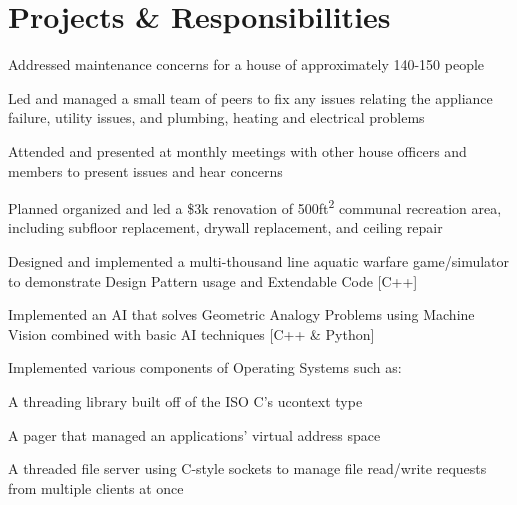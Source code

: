 \documentclass[letterpaper]{headers} %
\begin{document}
\begin{minipage}[t]{0.66\textwidth}
\sectionspace

\section{Projects \& Responsibilities}
	\begin{tightitemize}
		\item Addressed maintenance concerns for a house of approximately 140-150 people
		\item Led and managed a small team of peers to fix any issues relating the appliance failure, utility issues, and plumbing, heating and electrical problems
		\item Attended and presented at monthly meetings with other house officers and members to present issues and hear concerns
		\item Planned organized and led a \$3k renovation of 500ft\textsuperscript{2} communal recreation area, including subfloor replacement, drywall replacement, and ceiling repair
	\end{tightitemize}
	
	\sectionspace
	
	\begin{tightitemize}
		\item Designed and implemented a multi-thousand line aquatic warfare game/simulator to demonstrate Design Pattern usage and Extendable Code [C++]
		\item Implemented an AI that solves Geometric Analogy Problems using Machine Vision combined with basic AI techniques [C++ \& Python]
		\item Implemented various components of Operating Systems such as:\\
		\begin{tightitemize}
			\item A threading library built off of the ISO C's ucontext type
			\item A pager that managed an applications' virtual address space
			\item A threaded file server using C-style sockets to manage file read/write requests from multiple clients at once
		\end{tightitemize}
	\end{tightitemize}

\end{minipage}
\end{document}
